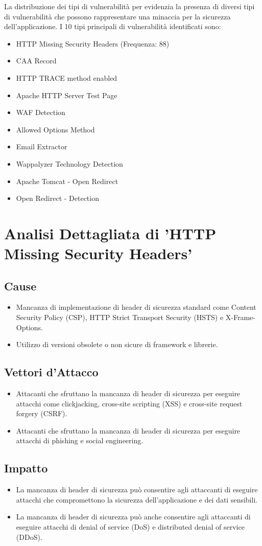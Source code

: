 La distribuzione dei tipi di vulnerabilità per  evidenzia la presenza di diversi tipi di vulnerabilità che possono rappresentare una minaccia per la sicurezza dell'applicazione. I 10 tipi principali di vulnerabilità identificati sono:
\begin{itemize}
\item HTTP Missing Security Headers (Frequenza: 88)
\item CAA Record
\item HTTP TRACE method enabled
\item Apache HTTP Server Test Page
\item WAF Detection
\item Allowed Options Method
\item Email Extractor
\item Wappalyzer Technology Detection
\item Apache Tomcat - Open Redirect
\item Open Redirect - Detection
\end{itemize}
\section{Analisi Dettagliata di 'HTTP Missing Security Headers'}

\subsection{Cause}
\begin{itemize}
\item Mancanza di implementazione di header di sicurezza standard come Content Security Policy (CSP), HTTP Strict Transport Security (HSTS) e X-Frame-Options.
\item Utilizzo di versioni obsolete o non sicure di framework e librerie.
\end{itemize}
\subsection{Vettori d'Attacco}
\begin{itemize}
\item Attacanti che sfruttano la mancanza di header di sicurezza per eseguire attacchi come clickjacking, cross-site scripting (XSS) e cross-site request forgery (CSRF).
\item Attacanti che sfruttano la mancanza di header di sicurezza per eseguire attacchi di phishing e social engineering.
\end{itemize}
\subsection{Impatto}
\begin{itemize}
\item La mancanza di header di sicurezza può consentire agli attaccanti di eseguire attacchi che compromettono la sicurezza dell'applicazione e dei dati sensibili.
\item La mancanza di header di sicurezza può anche consentire agli attaccanti di eseguire attacchi di denial of service (DoS) e distributed denial of service (DDoS).
\end{itemize}

